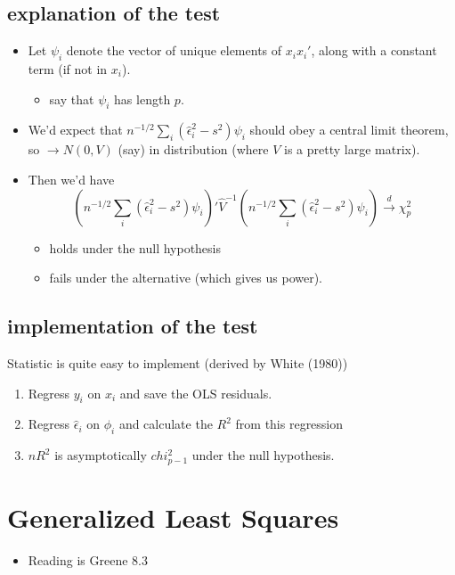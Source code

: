 \subsection{explanation of the test}
\label{sec-2-3}

\begin{itemize}
\item Let $\psi_i$ denote the vector of unique elements of $x_ix_i'$,
       along with a constant term (if not in $x_i$).
\begin{itemize}
\item say that $\psi_i$ has length $p$.
\end{itemize}
\item We'd expect that $n^{-1/2} \sum_i (\hat\epsilon_i^2 - s^2)
       \psi_i$ should obey a central limit theorem, so $\to N(0, V)$
       (say) in distribution (where $V$ is a pretty large matrix).
\item Then we'd have 
       \[\left(n^{-1/2} \sum_i (\hat\epsilon_i^2 - s^2)\psi_i\right)'
       \hat V^{-1} \left(n^{-1/2} \sum_i (\hat\epsilon_i^2 -
       s^2)\psi_i\right) \xrightarrow{d} \chi_p^2\]
\begin{itemize}
\item holds under the null hypothesis
\item fails under the alternative (which gives us power).
\end{itemize}
\end{itemize}
\subsection{implementation of the test}
\label{sec-2-4}

     Statistic is quite easy to implement (derived by White (1980))

\begin{enumerate}
\item Regress $y_i$ on $x_i$ and save the OLS residuals.
\item Regress $\hat\epsilon_i$ on $\phi_i$ and calculate the $R^2$
        from this regression
\item $n R^2$ is asymptotically $chi^2_{p-1}$ under the null
        hypothesis.
\end{enumerate}
\section{Generalized Least Squares}
\label{sec-3}

\begin{itemize}
\item Reading is Greene 8.3
\end{itemize}
